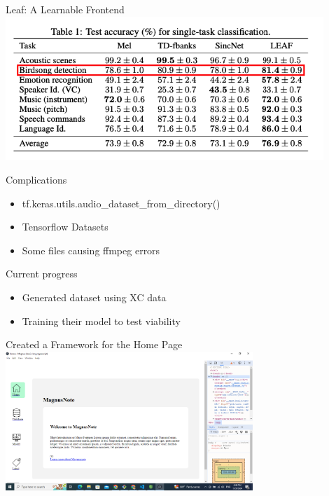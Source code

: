 \begin{frame}{Leaf: A Learnable Frontend}
    \centering
    \includegraphics[height=0.7\textheight,width=0.9\textwidth,keepaspectratio]{images/leaf_results_paper.png}
\end{frame}

\begin{frame}{Complications}
    \begin{itemize}
        \item tf.keras.utils.audio\_dataset\_from\_directory()
        \item Tensorflow Datasets
        \item Some files causing ffmpeg errors
    \end{itemize}
\end{frame}

\begin{frame}{Current progress}
    \begin{itemize}
        \item Generated dataset using XC data
        \item Training their model to test viability
    \end{itemize}
\end{frame}


\begin{frame}{Created a Framework for the Home Page}
    \centering
    \includegraphics[height=0.7\textheight,width=0.7\textwidth,keepaspectratio]{homepage.png}  
\end{frame}

